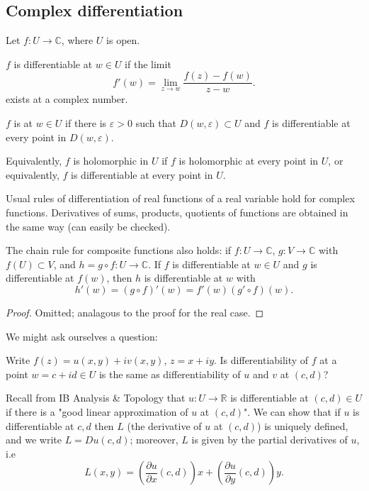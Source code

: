 \documentclass[a4paper]{scrartcl}
\begin{document}
\subsection{Complex differentiation}
Let $f: U \rightarrow \mathbb{C}$, where $U$ is open. 
\begin{definition*}[Differentiability]
     $f$ is differentiable at $w \in U$ if the limit \[
     f' (w)=\lim_{z \rightarrow w} \frac{f (z)-f (w)}{z-w}
     .\] exists at a complex number.
\end{definition*}
\begin{definition*}
     $f$ is \footnotemark at $w \in U$ if there is $\varepsilon >0$ such that $D (w, \varepsilon)\subset U$ and $f$ is differentiable at every point in $D (w, \varepsilon)$. 

     Equivalently, $f$ is holomorphic in $U$ if $f$ is holomorphic at every point in $U$, or equivalently, $f$ is differentiable at every point in $U$.
\end{definition*}
Usual rules of differentiation of real functions of a real variable hold for complex functions. Derivatives of sums, products, quotients of functions are obtained in the same way (can easily be checked). 

\begin{proposition}
     The chain rule for composite functions also holds: if $f: U \rightarrow \mathbb{C}$, $g: V \rightarrow \mathbb{C}$ with $f (U) \subset V$, and $h= g \circ f : U \rightarrow \mathbb{C}$. If $f$ is differentiable at $w \in U$ and $g$ is differentiable at $f (w)$, then $h$ is differentiable at $w$ with \[
     h' (w)=(g \circ f)' (w)= f' (w) (g' \circ f)(w)
     .\] 
\end{proposition}
\begin{proof}
     Omitted; analagous to the proof for the real case.
\end{proof}
We might ask ourselves a question: 

Write $f (z)= u (x,y)+iv (x,y)$, $z=x+iy$. Is differentiability of $f$ at a point $w=c+id \in U$ is the same as differentiability of $u $ and $v$ at $(c,d)$? 

Recall from IB Analysis \& Topology that $u : U \rightarrow \mathbb{R}$ is differentiable at $(c,d) \in U$ if there is a "good linear approximation of $u$ at $(c,d)$". We can show that if  $u$ is differentiable at $c,d$ then $L$ (the derivative of $u$ at $(c,d)$) is uniquely defined, and we write $L=Du (c,d)$; moreover, $L$ is given by the partial derivatives of $u$, i.e \[
L (x,y)= \left(\frac{\partial u}{\partial x} (c,d)\right)x + \left( \frac{\partial u}{\partial y}(c,d)\right)y
.\]  
\end{document}
